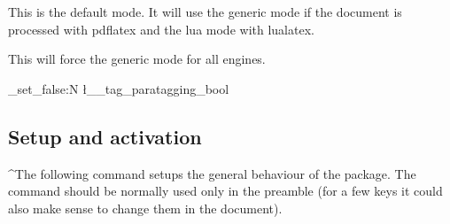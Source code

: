 \documentclass[DIV=12,parskip=half-,bibliography=totoc]{scrartcl}
\newcommand\parataggingOff{\bool_set_false:N \l__tag_paratagging_bool}
\begin{document}

This is the default mode. It will use the generic mode if the document is processed with pdflatex and the lua mode with lualatex.


This will force the generic mode for all engines.

\parataggingOff


\subsection{Setup and activation}\label{ssec:setup}

\TagP^The following command setups the general behaviour of the package. The command should be normally used only in the preamble (for a few keys it could also make sense to change them in the document).


\DescribeMacro{}
\end{document}
